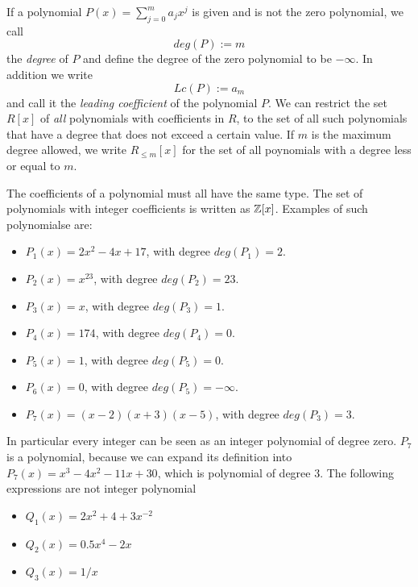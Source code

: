 If a polynomial $P(x)=\sum_{j=0}^m a_jx^j$ is given and is not the zero polynomial, we call 
\begin{equation}
deg(P):=m
\end{equation}
the \textit{degree} of $P$ and define the degree of the zero polynomial to be $-\infty$. In addition we write 
\begin{equation}
\label{def_leading_coefficient}
Lc(P):=a_m
\end{equation}
and call it the \textit{leading coefficient} of the polynomial $P$. We can restrict the set $R[x]$ of \textit{all} polynomials with coefficients in $R$, to the set of all such polynomials that have a degree that does not exceed a certain value. If $m$ is the maximum degree allowed, we write $R_{\leq m}[x]$ for the set of all poynomials with a degree less or equal to $m$.
\begin{example} The coefficients of a polynomial must all have the same type. The set of polynomials with integer coefficients is written as $\mathbb{Z}[x]$. Examples of such polynomialse are:
\begin{itemize}
\item $P_1(x)= 2x^2 -4x +17$, with degree $deg(P_1)=2$.
\item $P_2(x)= x^{23}$, with degree $deg(P_2)=23$.
\item $P_3(x)= x$, with degree $deg(P_3)=1$.
\item $P_4(x)= 174$, with degree $deg(P_4)=0$.
\item $P_5(x)= 1$, with degree $deg(P_5)=0$.
\item $P_6(x)=0$, with degree $deg(P_5)=-\infty$.
\item $P_7(x)= (x-2)(x+3)(x-5)$, with degree $deg(P_3)=3$.
\end{itemize}
In particular every integer can be seen as an integer polynomial of degree zero. $P_7$ is a polynomial, because we can expand its definition into $P_7(x)=x^3 - 4 x^2 - 11 x + 30$, which is polynomial of degree $3$. The following expressions are not integer polynomial
\begin{itemize}
\item $Q_1(x)= 2x^2 + 4 + 3x^{-2}$
\item $Q_2(x)= 0.5x^4 -2x$
\item $Q_3(x)=1/x$
\end{itemize}
\end{example}
